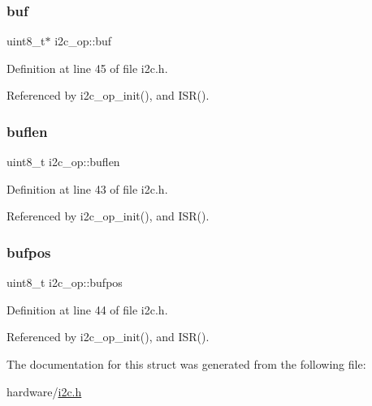 \mbox{\label{structi2c__op_ad988da068bf828e0f7ccfea5e9a5b83f}} 
\subsubsection{\texorpdfstring{buf}{buf}}
{\footnotesize\ttfamily uint8\+\_\+t$\ast$ i2c\+\_\+op\+::buf}



Definition at line 45 of file i2c.\+h.



Referenced by i2c\+\_\+op\+\_\+init(), and I\+S\+R().

\mbox{\label{structi2c__op_afd970c99924335052fcc298abda4bfd5}} 
\subsubsection{\texorpdfstring{buflen}{buflen}}
{\footnotesize\ttfamily uint8\+\_\+t i2c\+\_\+op\+::buflen}



Definition at line 43 of file i2c.\+h.



Referenced by i2c\+\_\+op\+\_\+init(), and I\+S\+R().

\mbox{\label{structi2c__op_a5d137a5400fc18224e7761017f0300fa}} 
\subsubsection{\texorpdfstring{bufpos}{bufpos}}
{\footnotesize\ttfamily uint8\+\_\+t i2c\+\_\+op\+::bufpos}



Definition at line 44 of file i2c.\+h.



Referenced by i2c\+\_\+op\+\_\+init(), and I\+S\+R().



The documentation for this struct was generated from the following file\+:\begin{DoxyCompactItemize}
\item 
hardware/\hyperlink{i2c_8h}{i2c.\+h}\end{DoxyCompactItemize}
